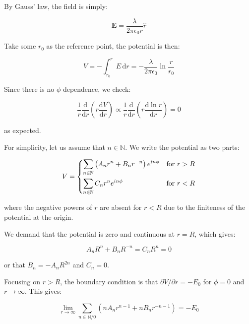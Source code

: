\documentclass[12pt]{article}
\begin{document}
By Gauss' law, the field is simply:

\begin{equation}
    \mathbf{E} = \frac{\lambda}{2\pi\epsilon_{0}r} \hat{r}
\end{equation}

Take some $r_{0}$ as the reference point, the potential is then:

\begin{equation}
    V = -\int_{r_{0}}^{r} E \, \mathrm{d}r = -\frac{\lambda}{2\pi\epsilon_{0}} \ln{\frac{r}{r_{0}}}
\end{equation}

Since there is no $\phi$ dependence, we check:

\begin{equation}
    \frac{1}{r} \frac{\mathrm{d}}{\mathrm{d}r} \left( r \frac{\mathrm{d}V}{\mathrm{d}r} \right) \propto \frac{1}{r} \frac{\mathrm{d}}{\mathrm{d}r} \left( r \frac{\mathrm{d}\ln{r}}{\mathrm{d}r} \right) = 0
\end{equation}

as expected.

For simplicity, let us assume that $n \in \mathbb{N}$. We write the potential as two parts:

\begin{equation}
    V =
    \begin{dcases}
        \sum_{n \in \mathbb{N}} \left( A_{n} r^{n} + B_{n} r^{-n} \right) e^{in\phi} & \text{for } r > R \\
        \sum_{n \in \mathbb{N}} C_{n} r^{n} e^{in\phi}                               & \text{for } r < R
    \end{dcases}
\end{equation}

where the negative powers of $r$ are absent for $r < R$ due to the finiteness of the potential at the origin.

We demand that the potential is zero and continuous at $r = R$, which gives:

\begin{equation}
    A_{n} R^{n} + B_{n} R^{-n} = C_{n} R^{n} = 0
\end{equation}

or that $B_{n} = -A_{n} R^{2n}$ and $C_{n} = 0$.

Focusing on $r > R$, the boundary condition is that $\partial V/\partial r = -E_{0}$ for $\phi = 0$ and $r \to \infty$. This gives:

\begin{equation}
    \lim_{r \to \infty} \sum_{n \in \mathbb{N}/0} \left( n A_{n} r^{n-1} + n B_{n} r^{-n-1} \right) = -E_{0}
\end{equation}
\end{document}
